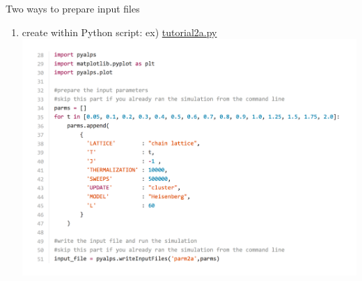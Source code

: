 \begin{frame}[t,fragile]{Two ways to prepare input files}
  \begin{enumerate}
    \setlength{\itemsep}{1em}
  \item create within Python script: ex) \href{https://github.com/cmsi/alps-tutorial/blob/tutorials/tutorials/mc-02-susceptibilities/tutorial2a.py}{tutorial2a.py}
      \includegraphics[height=.72\textheight]{tutorial2a-1.pdf}
  \end{enumerate}
\end{frame}

